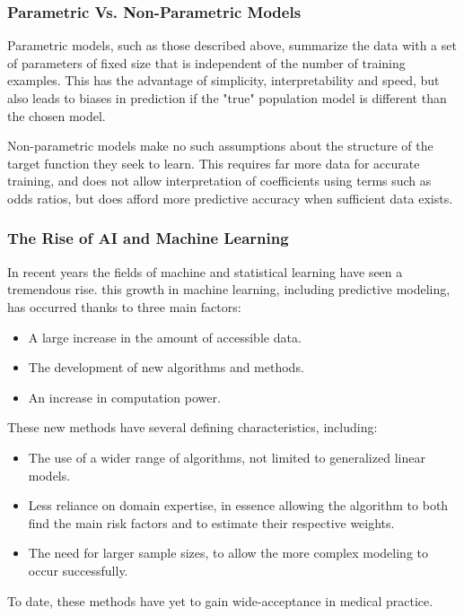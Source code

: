 \documentclass[a4paper,12pt]{article}
\begin{document}
			\subsubsection{Parametric Vs. Non-Parametric Models}
			Parametric models, such as those described above, summarize the data with a set of parameters of fixed size that is independent of the number of training examples. This has the advantage of simplicity, interpretability and speed, but also leads to biases in prediction if the "true" population model is different than the chosen model.
			
			Non-parametric models make no such assumptions about the structure of the target function they seek to learn. This requires far more data for accurate training, and does not allow interpretation of coefficients using terms such as odds ratios, but does afford more predictive accuracy when sufficient data exists\cite{Russell2002}.
			
			\subsubsection{The Rise of AI and Machine Learning}
		
			In recent years the fields of machine and statistical learning have seen a tremendous rise\cite{Obermeyer2016}. this growth in machine learning, including predictive modeling, has occurred thanks to three main factors\cite{Shalev-Shwartz2014}:
			\begin{itemize}
				\item A large increase in the amount of accessible data.
				\item The development of new algorithms and methods.
				\item An increase in computation power.
			\end{itemize} 
			These new methods have several defining characteristics, including:
			\begin{itemize}
				\item The use of a wider range of algorithms, not limited to generalized linear models.
				\item Less reliance on domain expertise, in essence allowing the algorithm to both find the main risk factors and to estimate their respective weights.
				\item The need for larger sample sizes, to allow the more complex modeling to occur successfully.
			\end{itemize}
			To date, these methods have yet to gain wide-acceptance in medical practice\cite{Obermeyer2016,Deo2015}.
			
\end{document}
